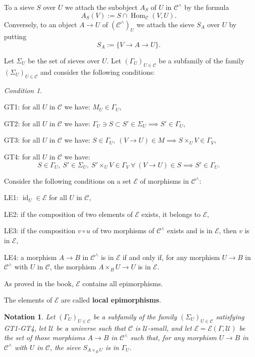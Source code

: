 \documentclass[12pt]{article}%
\newtheorem{nota}[thm]{Notation}
\theoremstyle{remark}
\newtheorem{cond}[thm]{Condition}
\theoremstyle{definition}
\newcommand{\nn}{\noindent}
\newcommand{\cc}{\mathcal}
\newcommand{\C}{\mathcal C}
\newcommand{\U}{\mathcal U}
\DeclareMathOperator{\id}{id}
\DeclareMathOperator{\Hom}{Hom}%
\begin{document}
To a sieve $S$ over $U$ we attach the subobject $A_S$ of $U$ in $\C^\wedge$ by the formula
$$
A_S(V):=S\cap\Hom_\C(V,U).
$$ 
Conversely, to an object $A\to U$ of $(\C^\wedge)_U$ we attach the sieve $S_A$ over $U$ by putting 
$$
S_A:=\{V\to A\to U\}.
$$

Let $\Sigma_U$ be the set of sieves over $U$. Let $(\Gamma_U)_{U\in\C}$ be a subfamily of the family $(\Sigma_U)_{U\in\C}$ and consider the following conditions:

\begin{cond}\label{gt}
$\ $

\nn GT1: for all $U$ in $\C$ we have: $M_U\in\Gamma_U$,

\nn GT2: for all $U$ in $\C$ we have: $\Gamma_U\ni S\subset S'\in\Sigma_U\implies S'\in\Gamma_U$,

\nn GT3: for all $U$ in $\C$ we have: $S\in\Gamma_U,\ (V\to U)\in M\implies S\times_UV\in\Gamma_V$,

\nn GT4: for all $U$ in $\C$ we have: 
$$
S\in\Gamma_U,\ S'\in\Sigma_U,\ S'\times_UV\in\Gamma_V\ \forall\ (V\to U)\in S\implies S'\in\Gamma_U.
$$
\end{cond}

Consider the following conditions on a set $\cc E$ of morphisms in $\C^\wedge$:

\nn LE1: $\id_U\in\cc E$ for all $U$ in $\C$,

\nn LE2: if the composition of two elements of $\cc E$ exists, it belongs to $\cc E$,

\nn LE3: if the composition $v\circ u$ of two morphisms of $\C^\wedge$ exists and is in $\cc E$, then $v$ is in $\cc E$,

\nn LE4: a morphism $A\to B$ in $\C^\wedge$ is in $\cc E$ if and only if, for any morphism $U\to B$ in $\C^\wedge$ with $U$ in $\C$, the morphism $A\times_BU\to U$ is in $\cc E$.

As proved in the book, $\cc E$ contains all epimorphisms. 

The elements of $\cc E$ are called \textbf{local epimorphisms}.

\begin{nota}\label{cce}
Let $(\Gamma_U)_{U\in\C}$ be a subfamily of the family $(\Sigma_U)_{U\in\C}$ satisfying GT1-GT4, let $\U$ be a universe such that $\C$ is $\U$-small, and let $\cc E=\cc E(\Gamma,\U)$ be the set of those morphisms $A\to B$ in $\C^\wedge$ such that, for any morphism $U\to B$ in $\C^\wedge$ with $U$ in $\C$, the sieve $S_{A\times_BU}$ is in $\Gamma_U$. 
\end{nota}
\end{document}
